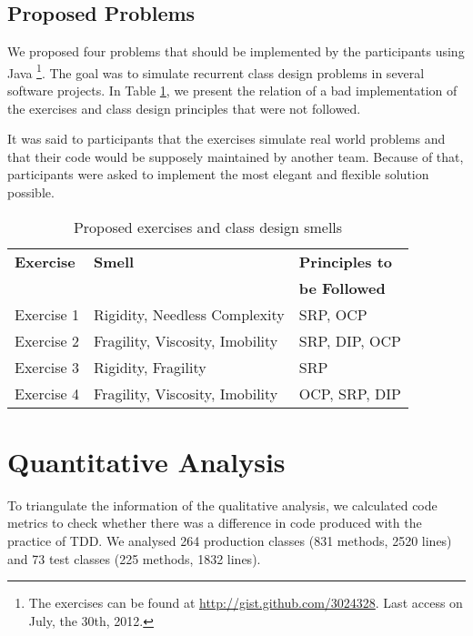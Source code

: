 \documentclass[conference]{IEEEtran}
\begin{document}
\subsection{Proposed Problems}
\label{sec:exercicios}

We proposed four problems that should be implemented by the participants using Java
\footnote{The exercises can be found at \url{http://gist.github.com/3024328}. Last access on July, the 30th, 2012.}. 
The goal was to simulate recurrent class design problems in several software projects.
In Table \ref{tab:problemas-exercicios}, we present the relation of a bad implementation of
the exercises and class design principles that were not followed.

It was said to participants that the exercises simulate real world problems and that their code
would be supposely maintained by another team. Because of that, participants were asked to
implement the most elegant and flexible solution possible.

\begin{table}
	\centering
	\begin{tabular}{| l | l | l | }
		\hline
		\textbf{Exercise} & \textbf{Smell} & \textbf{Principles to}\\
		& & \textbf{be Followed}\\
		
		\hline
		
		Exercise 1 & Rigidity, Needless Complexity & SRP, OCP \\
		Exercise 2 & Fragility, Viscosity, Imobility & SRP, DIP, OCP \\
		Exercise 3 & Rigidity, Fragility & SRP\\
		Exercise 4 & Fragility, Viscosity, Imobility & OCP, SRP, DIP \\
		
		\hline
	\end{tabular}
	\caption{Proposed exercises and class design smells}
	\label{tab:problemas-exercicios}
\end{table}

\section{Quantitative Analysis}

To triangulate the information of the qualitative analysis, we calculated
code metrics to check whether there was a difference in code produced
with the practice of TDD.
We analysed
264 production classes (831 methods, 2520 lines) and
73 test classes (225 methods, 1832 lines).
\end{document}
